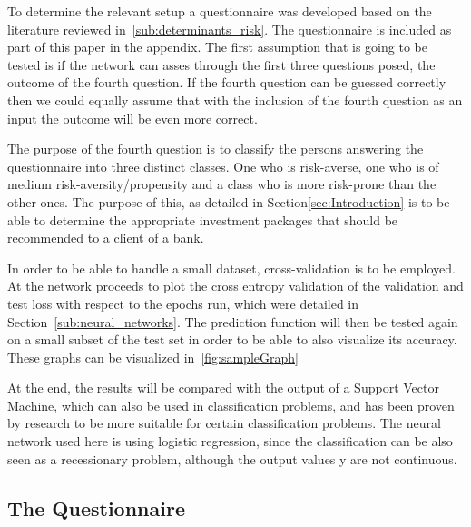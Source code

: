 \documentclass[12pt]{article}
\begin{document}
To determine the relevant setup a questionnaire was developed based on the literature reviewed in~\ref{sub:determinants_risk}. The questionnaire is included as part of this paper in the appendix. The first assumption that is going to be tested is if the network can asses through the first three questions posed, the outcome of the fourth question. If the fourth question can be guessed correctly then we could equally assume that with the inclusion of the fourth question as an input the outcome will be even more correct. 

The purpose of the fourth question is to classify the persons answering the questionnaire into three distinct classes. One who is risk-averse, one who is of medium risk-aversity/propensity and a class who is more risk-prone than the other ones. The purpose of this, as detailed in Section\ref{sec:Introduction} is to be able to determine the appropriate investment packages that should be recommended to a client of a bank.

In order to be able to handle a small dataset, cross-validation is to be employed. At the network proceeds to plot the cross entropy validation of the validation and test loss with respect to the epochs run, which were detailed in Section~\ref{sub:neural_networks}. The prediction function will then be tested again on a small subset of the test set in order to be able to also visualize its accuracy. These graphs can be visualized in~\ref{fig:sampleGraph}

At the end, the results will be compared with the output of a Support Vector Machine, which can also be used in classification problems, and has been proven by research to be more suitable for certain classification problems. The neural network used here is using logistic regression, since the classification can be also seen as a recessionary problem, although the output values y are not continuous.
\subsection{The Questionnaire}
\end{document}
